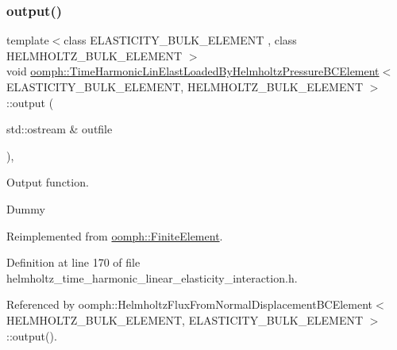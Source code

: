 \mbox{\label{classoomph_1_1TimeHarmonicLinElastLoadedByHelmholtzPressureBCElement_a1ecf56e825d5af950572efe4208ad307}} 
\subsubsection{\texorpdfstring{output()}{output()}\hspace{0.1cm}{\footnotesize\ttfamily [1/4]}}
{\footnotesize\ttfamily template$<$class E\+L\+A\+S\+T\+I\+C\+I\+T\+Y\+\_\+\+B\+U\+L\+K\+\_\+\+E\+L\+E\+M\+E\+NT , class H\+E\+L\+M\+H\+O\+L\+T\+Z\+\_\+\+B\+U\+L\+K\+\_\+\+E\+L\+E\+M\+E\+NT $>$ \\
void \hyperlink{classoomph_1_1TimeHarmonicLinElastLoadedByHelmholtzPressureBCElement}{oomph\+::\+Time\+Harmonic\+Lin\+Elast\+Loaded\+By\+Helmholtz\+Pressure\+B\+C\+Element}$<$ E\+L\+A\+S\+T\+I\+C\+I\+T\+Y\+\_\+\+B\+U\+L\+K\+\_\+\+E\+L\+E\+M\+E\+NT, H\+E\+L\+M\+H\+O\+L\+T\+Z\+\_\+\+B\+U\+L\+K\+\_\+\+E\+L\+E\+M\+E\+NT $>$\+::output (\begin{DoxyParamCaption}\item[{std\+::ostream \&}]{outfile }\end{DoxyParamCaption})\hspace{0.3cm}{\ttfamily [inline]}, {\ttfamily [virtual]}}



Output function. 

Dummy 

Reimplemented from \hyperlink{classoomph_1_1FiniteElement_a2ad98a3d2ef4999f1bef62c0ff13f2a7}{oomph\+::\+Finite\+Element}.



Definition at line 170 of file helmholtz\+\_\+time\+\_\+harmonic\+\_\+linear\+\_\+elasticity\+\_\+interaction.\+h.



Referenced by oomph\+::\+Helmholtz\+Flux\+From\+Normal\+Displacement\+B\+C\+Element$<$ H\+E\+L\+M\+H\+O\+L\+T\+Z\+\_\+\+B\+U\+L\+K\+\_\+\+E\+L\+E\+M\+E\+N\+T, E\+L\+A\+S\+T\+I\+C\+I\+T\+Y\+\_\+\+B\+U\+L\+K\+\_\+\+E\+L\+E\+M\+E\+N\+T $>$\+::output().

